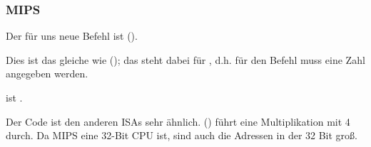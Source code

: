 \subsubsection{MIPS}



Der für uns neue Befehl ist  ().

Dies ist das gleiche wie  (); das  steht dabei für , d.h.
für den Befehl muss eine Zahl angegeben werden. 

 ist .

Der Code ist den anderen \ac{ISA}s sehr ähnlich.
 () führt eine Multiplikation mit 4 durch.
Da MIPS eine 32-Bit CPU ist, sind auch die Adressen in der  32 Bit groß.
